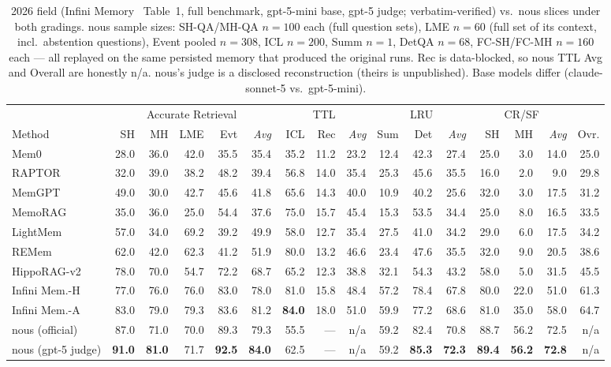 \documentclass{article}
\newcommand{\nous}{\textsf{nous}}
\begin{document}
\begin{table}[h]
\centering\scriptsize
\setlength{\tabcolsep}{2.6pt}
\renewcommand{\arraystretch}{1.12}
\begin{tabular}{@{}l rrrrr rrr rrr rrr r@{}}
\toprule
 & \multicolumn{5}{c}{Accurate Retrieval} & \multicolumn{3}{c}{TTL} & \multicolumn{3}{c}{LRU} & \multicolumn{3}{c}{CR/SF} & \\
\cmidrule(lr){2-6}\cmidrule(lr){7-9}\cmidrule(lr){10-12}\cmidrule(lr){13-15}
Method & SH & MH & LME & Evt & \emph{Avg} & ICL & Rec & \emph{Avg} & Sum & Det & \emph{Avg} & SH & MH & \emph{Avg} & Ovr. \\
\midrule
Mem0        & 28.0 & 36.0 & 42.0 & 35.5 & 35.4 & 35.2 & 11.2 & 23.2 & 12.4 & 42.3 & 27.4 & 25.0 &  3.0 & 14.0 & 25.0 \\
RAPTOR      & 32.0 & 39.0 & 38.2 & 48.2 & 39.4 & 56.8 & 14.0 & 35.4 & 25.3 & 45.6 & 35.5 & 16.0 &  2.0 &  9.0 & 29.8 \\
MemGPT      & 49.0 & 30.0 & 42.7 & 45.6 & 41.8 & 65.6 & 14.3 & 40.0 & 10.9 & 40.2 & 25.6 & 32.0 &  3.0 & 17.5 & 31.2 \\
MemoRAG     & 35.0 & 36.0 & 25.0 & 54.4 & 37.6 & 75.0 & 15.7 & 45.4 & 15.3 & 53.5 & 34.4 & 25.0 &  8.0 & 16.5 & 33.5 \\
LightMem    & 57.0 & 34.0 & 69.2 & 39.2 & 49.9 & 58.0 & 12.7 & 35.4 & 27.5 & 41.0 & 34.2 & 29.0 &  6.0 & 17.5 & 34.2 \\
REMem       & 62.0 & 42.0 & 62.3 & 41.2 & 51.9 & 80.0 & 13.2 & 46.6 & 23.4 & 47.6 & 35.5 & 32.0 &  9.0 & 20.5 & 38.6 \\
HippoRAG-v2 & 78.0 & 70.0 & 54.7 & 72.2 & 68.7 & 65.2 & 12.3 & 38.8 & 32.1 & 54.3 & 43.2 & 58.0 &  5.0 & 31.5 & 45.5 \\
Infini Mem.-H & 77.0 & 76.0 & 76.0 & 83.0 & 78.0 & 81.0 & 15.8 & 48.4 & 57.2 & 78.4 & 67.8 & 80.0 & 22.0 & 51.0 & 61.3 \\
Infini Mem.-A & 83.0 & 79.0 & 79.3 & 83.6 & 81.2 & \textbf{84.0} & 18.0 & 51.0 & 59.9 & 77.2 & 68.6 & 81.0 & 35.0 & 58.0 & 64.7 \\
\midrule
\nous{} (official) & 87.0 & 71.0 & 70.0 & 89.3 & 79.3 & 55.5 & --- & n/a & 59.2 & 82.4 & 70.8 & 88.7 & 56.2 & 72.5 & n/a \\
\nous{} (gpt-5 judge)      & \textbf{91.0} & \textbf{81.0} & 71.7 & \textbf{92.5} & \textbf{84.0} & 62.5 & --- & n/a & 59.2 & \textbf{85.3} & \textbf{72.3} & \textbf{89.4} & \textbf{56.2} & \textbf{72.8} & n/a \\
\bottomrule
\end{tabular}
\caption{2026 field (Infini Memory~\cite{infini} Table~1, full benchmark,
gpt-5-mini base, gpt-5 judge; verbatim-verified) vs.\ \nous{} slices under
both gradings. \nous{} sample sizes: SH-QA/MH-QA $n{=}100$ each (full
question sets), LME $n{=}60$ (full set of its context, incl.\ abstention
questions), Event pooled $n{=}308$, ICL $n{=}200$, Summ $n{=}1$, DetQA
$n{=}68$, FC-SH/FC-MH $n{=}160$ each --- all replayed on the same persisted
memory that produced the original runs. Rec is data-blocked, so \nous{} TTL Avg and
Overall are honestly n/a. \nous{}'s judge is a disclosed reconstruction
(theirs is unpublished). Base models differ (claude-sonnet-5 vs.\
gpt-5-mini).}
\label{tab:field2026}
\end{table}
\end{document}
